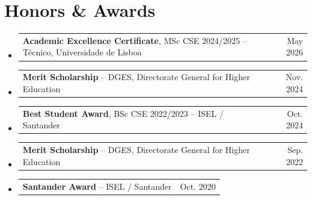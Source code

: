 \documentclass[letterpaper,11pt]{article}
\makeatletter
\newcommand{\resumeProjectHeading}[2]{
    \item
    \begin{tabular*}{0.97\textwidth}{l@{\extracolsep{\fill}}r}
      \small#1 & #2 \\
    \end{tabular*}\vspace{-7pt}
}
\newcommand{\resumeSubHeadingListStart}{\begin{itemize}[leftmargin=0.15in, label={}]}
\newcommand{\resumeSubHeadingListEnd}{\end{itemize}}
\makeatother
\begin{document}
\section{Honors \& Awards}
  \resumeSubHeadingListStart
    \resumeProjectHeading
        {\textbf{Academic Excellence Certificate}, MSc CSE 2024/2025 \textnormal{-- T\'{e}cnico, Universidade de Lisboa}}{May 2026}
    \resumeProjectHeading
        {\textbf{Merit Scholarship} \textnormal{-- DGES, Directorate General for Higher Education}}{Nov. 2024}
    \resumeProjectHeading
        {\textbf{Best Student Award}, BSc CSE 2022/2023 \textnormal{-- ISEL / Santander}}{Oct. 2024}
    \resumeProjectHeading
        {\textbf{Merit Scholarship} \textnormal{-- DGES, Directorate General for Higher Education}}{Sep. 2022}
    \resumeProjectHeading
        {\textbf{Santander Award} \textnormal{-- ISEL / Santander}}{Oct. 2020}
  \resumeSubHeadingListEnd


\end{document}
